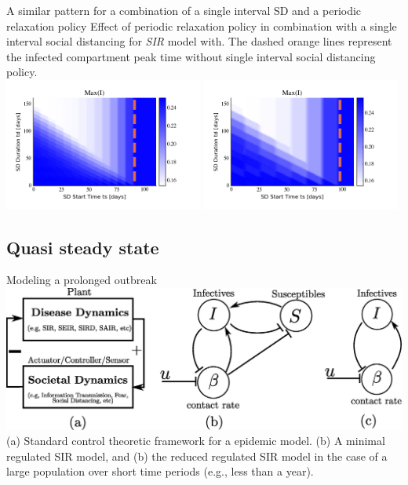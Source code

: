 \documentclass[10pt]{beamer}
\begin{document}
\begin{frame}{A similar pattern for a combination of a single interval SD and a periodic relaxation policy}
	Effect of periodic relaxation policy in combination with a single interval social distancing for \textit{SIR} model with. The dashed orange lines represent the infected compartment peak time without single interval social distancing policy. \\ \vspace{0.5cm}
	\includegraphics[width=0.49\textwidth]{epidemic-sp-heatmap1.png}
	\includegraphics[width=0.49\textwidth]{epidemic-sp-heatmap2.png} 
\end{frame}

\subsection{Quasi steady state}
\begin{frame}{Modeling a prolonged outbreak}
	\includegraphics[width=1\textwidth]{epidemic-qss.eps} \\ \vspace{0.5cm}
	\small
	(a) Standard control theoretic framework for a epidemic model. (b) A minimal regulated SIR model, and (b) the reduced regulated SIR model in the case of a large population over short time periods (e.g., less than a year).
\end{frame}
\end{document}
